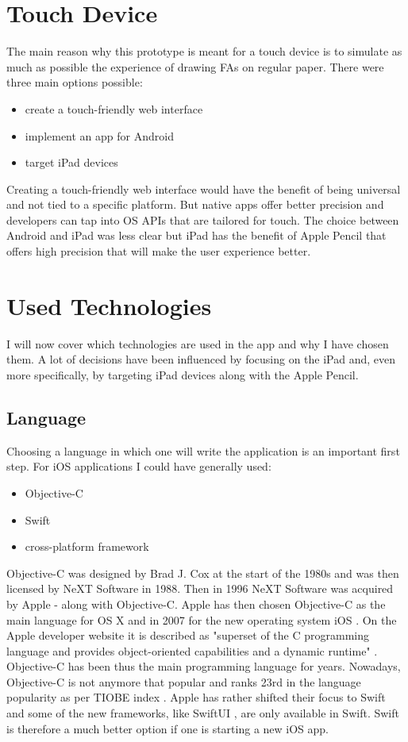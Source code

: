 \section{Touch Device}
The main reason why this prototype is meant for a touch device is to simulate as much as possible the experience of drawing FAs on regular paper. There were three main options possible:
\begin{itemize}
    \item create a touch-friendly web interface
    \item implement an app for Android
    \item target iPad devices
\end{itemize}
Creating a touch-friendly web interface would have the benefit of being universal and not tied to a specific platform. But native apps offer better precision and developers can tap into OS APIs that are tailored for touch. The choice between Android and iPad was less clear but iPad has the benefit of Apple Pencil \cite{apple-pencil} that offers high precision that will make the user experience better.

\section{Used Technologies}

I will now cover which technologies are used in the app and why I have chosen them. A lot of decisions have been influenced by focusing on the iPad and, even more specifically, by targeting iPad devices along with the Apple Pencil. 

\subsection{Language}

Choosing a language in which one will write the application is an important first step. For iOS applications I could have generally used:
\begin{itemize}
    \item Objective-C
    \item Swift
    \item cross-platform framework
\end{itemize}

Objective-C was designed by Brad J. Cox at the start of the 1980s and was then licensed by NeXT Software in 1988. Then in 1996 NeXT Software was acquired by Apple - along with Objective-C. Apple has then chosen Objective-C as the main language for OS X and in 2007 for the new operating system iOS \cite{objective-c-programming}. On the Apple developer website it is described as "superset of the C programming language and provides object-oriented capabilities and a dynamic runtime" \cite{objective-c}. Objective-C has been thus the main programming language for years. Nowadays, Objective-C is not anymore that popular and ranks 23rd in the language popularity as per TIOBE index \cite{tiobe-index}. Apple has rather shifted their focus to Swift and some of the new frameworks, like SwiftUI \cite{swiftui}, are only available in Swift. Swift is therefore a much better option if one is starting a new iOS app.

